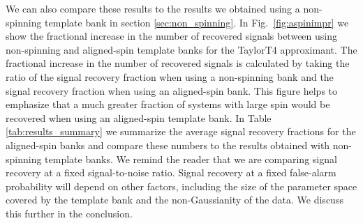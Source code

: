 We can also compare these results to the results we obtained using a
non-spinning template bank in section \ref{sec:non_spinning}. In 
Fig.~\ref{fig:aspinimpr} we show the fractional increase in the number
of recovered signals between using non-spinning and aligned-spin template banks
for the TaylorT4 approximant. The fractional increase in the number
of recovered signals is calculated by taking the ratio of the signal recovery 
fraction when using a non-spinning bank and the signal recovery fraction when 
using an aligned-spin bank. This figure helps to
emphasize that a much greater fraction of systems with large spin would be
recovered when using an aligned-spin template bank. In Table 
\ref{tab:results_summary} we summarize the average signal
recovery fractions for the aligned-spin banks and
compare these numbers to the results obtained with non-spinning template banks. 
We remind the reader that we are comparing signal recovery at a 
fixed signal-to-noise ratio. Signal recovery at a fixed false-alarm 
probability will depend on other factors, including the size of the parameter 
space covered by the template bank and the non-Gaussianity of the data. We 
discuss this further in the conclusion.

